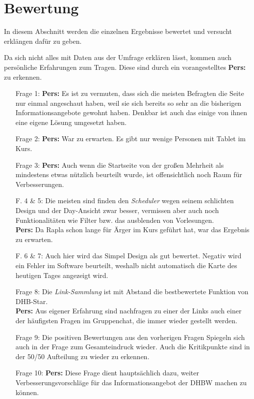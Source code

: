 \section{Bewertung}
In diesem Abschnitt werden die einzelnen Ergebnisse bewertet und versucht erklängen dafür zu geben.

Da sich nicht alles mit Daten aus der Umfrage erklären lässt, kommen auch persönliche Erfahrungen zum Tragen. Diese sind durch ein vorangestelltes \textbf{Pers:} zu erkennen. 

\begin{itemize}
\item[Frage 1:]
{\textbf{Pers:} Es ist zu vermuten, dass sich die meisten Befragten die Seite nur einmal angeschaut haben, weil sie sich bereits so sehr an die bisherigen Informationsangebote gewohnt haben. Denkbar ist auch das einige von ihnen eine eigene Lösung umgesetzt haben. }
\item[Frage 2:]
{\textbf{Pers:} War zu erwarten. Es gibt nur wenige Personen mit Tablet im Kurs. }
\item[Frage 3:]
{\textbf{Pers:} Auch wenn die Startseite von der großen Mehrheit als mindestens etwas nützlich beurteilt wurde, ist offensichtlich noch Raum für Verbesserungen.}
\item[F. 4 \& 5:]
{Die meisten sind finden den \emph{Scheduler} wegen seinem schlichten Design und der Day-Ansicht zwar besser, vermissen aber auch noch Funktionalitäten wie Filter bzw. das ausblenden von Vorlesungen. \\
	\textbf{Pers:} Da Rapla schon lange für Ärger im Kurs geführt hat, war das Ergebnis zu erwarten.}
\item[F. 6 \& 7:]
{Auch hier wird das Simpel Design als gut bewertet. Negativ wird ein Fehler im Software beurteilt, weshalb nicht automatisch die Karte des heutigen Tages angezeigt wird. }
\item [Frage 8:]
{Die \emph{Link-Sammlung} ist mit Abstand die bestbewertete Funktion von DHB-Star. \\
	\textbf{Pers:} Aus eigener Erfahrung sind nachfragen zu einer der Links auch einer der häufigsten Fragen im Gruppenchat, die immer wieder gestellt werden. }
\item [Frage 9:]
{Die positiven Bewertungen aus den vorherigen Fragen Spiegeln sich auch in der Frage zum Gesamteindruck wieder. Auch die Kritikpunkte sind in der 50/50 Aufteilung zu wieder zu erkennen. }
\item [Frage 10:]
{\textbf{Pers:} Diese Frage dient hauptsächlich dazu, weiter Verbesserungsvorschläge für das Informationsangebot der DHBW machen zu können. }
\end{itemize}

